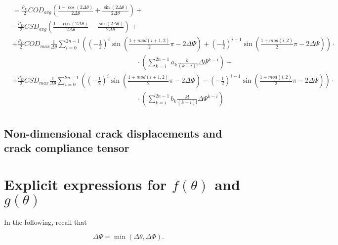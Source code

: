 \documentclass[review]{elsarticle}
\begin{document}
\begin{enumerate}
\begin{equation}
\begin{aligned}
&=\frac{\rho_{D}}{2}COD_{avg}\left(\frac{1-\cos\left(2\Delta\theta\right)}{2\Delta\theta}+\frac{\sin\left(2\Delta\theta\right)}{2\Delta\theta}\right)+\\
&-\frac{\rho_{D}}{2}CSD_{avg}\left(\frac{1-\cos\left(2\Delta\theta\right)}{2\Delta\theta}-\frac{\sin\left(2\Delta\theta\right)}{2\Delta\theta}\right)+\\
&+\frac{\rho_{D}}{2}COD_{max}\frac{1}{\Delta\theta}\sum_{i=0}^{2n-1}\left(\left(-\frac{1}{2}\right)^{i}\sin\left(\frac{1+mod\left(i+1,2\right)}{2}\pi-2\Delta\Psi\right)+\left(-\frac{1}{2}\right)^{i+1}\sin\left(\frac{1+mod\left(i,2\right)}{2}\pi-2\Delta\Psi\right)\right)\cdot\\&\qquad\qquad\qquad\qquad\qquad\qquad\qquad\qquad\qquad\cdot\left(\sum_{k=i}^{2n-1}a_{k}\frac{k!}{\left(k-i\right)!}\Delta\Psi^{k-i}\right)+\\
&+\frac{\rho_{D}}{2}CSD_{max}\frac{1}{\Delta\theta}\sum_{i=0}^{2n-1}\left(\left(-\frac{1}{2}\right)^{i}\sin\left(\frac{1+mod\left(i+1,2\right)}{2}\pi-2\Delta\Psi\right)-\left(-\frac{1}{2}\right)^{i+1}\sin\left(\frac{1+mod\left(i,2\right)}{2}\pi-2\Delta\Psi\right)\right)\cdot\\&\qquad\qquad\qquad\qquad\qquad\qquad\qquad\qquad\qquad\cdot\left(\sum_{k=i}^{2n-1}b_{k}\frac{k!}{\left(k-i\right)!}\Delta\Psi^{k-i}\right)\\
\end{aligned}
\end{equation}

\end{enumerate}

\subsection{Non-dimensional crack displacements and crack compliance tensor}



\appendix
\section{Explicit expressions for $f\left(\theta\right)$ and $g\left(\theta\right)$}\label{app:fandgexplicit}

In the following, recall that

\begin{equation}
\Delta\Psi=\min\left(\Delta\theta,\Delta\Phi\right).
\end{equation}
\end{document}
